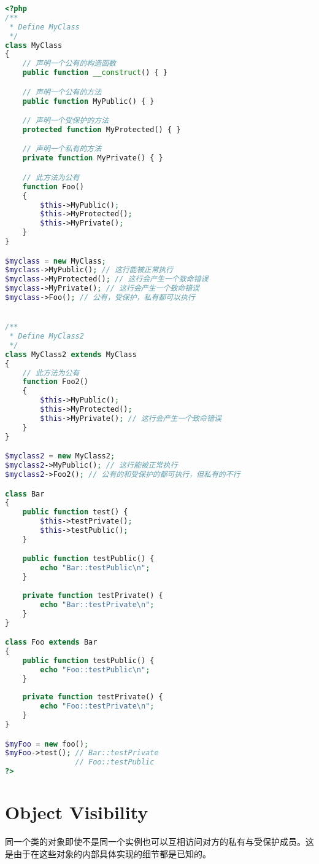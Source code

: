 \begin{lstlisting}[language=PHP]
<?php
/**
 * Define MyClass
 */
class MyClass
{
    // 声明一个公有的构造函数
    public function __construct() { }

    // 声明一个公有的方法
    public function MyPublic() { }

    // 声明一个受保护的方法
    protected function MyProtected() { }

    // 声明一个私有的方法
    private function MyPrivate() { }

    // 此方法为公有
    function Foo()
    {
        $this->MyPublic();
        $this->MyProtected();
        $this->MyPrivate();
    }
}

$myclass = new MyClass;
$myclass->MyPublic(); // 这行能被正常执行
$myclass->MyProtected(); // 这行会产生一个致命错误
$myclass->MyPrivate(); // 这行会产生一个致命错误
$myclass->Foo(); // 公有，受保护，私有都可以执行


/**
 * Define MyClass2
 */
class MyClass2 extends MyClass
{
    // 此方法为公有
    function Foo2()
    {
        $this->MyPublic();
        $this->MyProtected();
        $this->MyPrivate(); // 这行会产生一个致命错误
    }
}

$myclass2 = new MyClass2;
$myclass2->MyPublic(); // 这行能被正常执行
$myclass2->Foo2(); // 公有的和受保护的都可执行，但私有的不行

class Bar 
{
    public function test() {
        $this->testPrivate();
        $this->testPublic();
    }

    public function testPublic() {
        echo "Bar::testPublic\n";
    }
    
    private function testPrivate() {
        echo "Bar::testPrivate\n";
    }
}

class Foo extends Bar 
{
    public function testPublic() {
        echo "Foo::testPublic\n";
    }
    
    private function testPrivate() {
        echo "Foo::testPrivate\n";
    }
}

$myFoo = new foo();
$myFoo->test(); // Bar::testPrivate 
                // Foo::testPublic
?>
\end{lstlisting}



\section{Object Visibility}

同一个类的对象即使不是同一个实例也可以互相访问对方的私有与受保护成员。这是由于在这些对象的内部具体实现的细节都是已知的。

